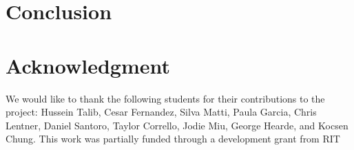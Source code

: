 \documentclass{sig-alternate-05-2015}
\begin{document}

\section{Conclusion}
\label{sec: conclusion}



\section*{Acknowledgment}

We would like to thank the following students for their contributions to the project: Hussein Talib, Cesar Fernandez, Silva Matti, Paula Garcia, Chris Lentner, Daniel Santoro, Taylor Corrello, Jodie Miu, George Hearde, and Kocsen Chung. This work was partially funded through a development grant from RIT



\balance %



\end{document}
